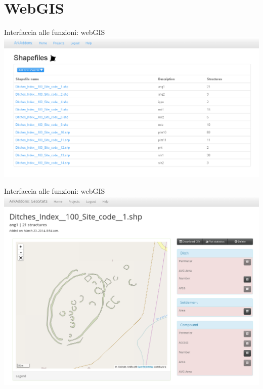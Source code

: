 \documentclass[xcolor=svgnames]{beamer}
\begin{document}
    \section{WebGIS}

        \begin{frame}{Interfaccia alle funzioni: webGIS}
            \includegraphics[width=1\textwidth]{img/shp-list}
        \end{frame}

        \begin{frame}{Interfaccia alle funzioni: webGIS}
            \includegraphics[width=1\textwidth]{img/shp-detail-1}
        \end{frame}
\end{document}
